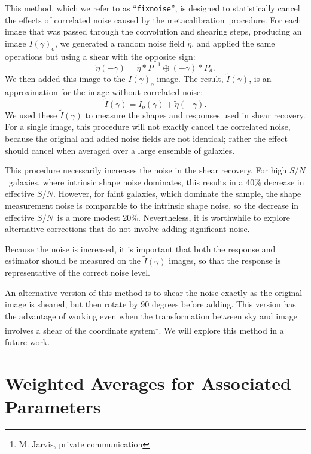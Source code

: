 \documentclass[a4paper,fleqn,usenatbib]{mnras}
\newcommand{\snr}{$S/N$}
\newcommand{\mcal}{metacalibration}
\newcommand{\fixnoise}{\texttt{fixnoise}}
\begin{document}
This method, which we refer to as ``\fixnoise'', is designed to statistically
cancel the effects of correlated noise caused by the \mcal\ procedure.  For each
image that was passed through the convolution and shearing steps, producing
an image $I(\gamma)_o$, we generated a random noise field
$\tilde{\eta}$, and applied the same operations but using a shear with
the opposite sign:
\begin{equation}
    \tilde{\eta}(-\gamma) = \tilde{\eta} \ast P^{-1} \oplus (-\gamma) \ast P_{d}.
\end{equation}
We then added this image to the $I(\gamma)_o$ image.
The result, $\tilde{I}(\gamma)$, is an approximation for the image
without correlated noise:
\begin{equation}
    \tilde{I}(\gamma) = I_o(\gamma) + \tilde{\eta}(-\gamma).
\end{equation}
We used these $\tilde{I}(\gamma)$ to measure the shapes and responses used in
shear recovery.  For a single image, this procedure will not exactly cancel the
correlated noise, because the original and added noise fields are not
identical; rather the effect should cancel when averaged over a large ensemble
of galaxies.

This procedure necessarily increases the noise in the shear recovery.  For high
\snr\ galaxies, where intrinsic shape noise dominates, this results in a 40\%
decrease in effective \snr. However, for faint galaxies, which dominate the
sample, the shape measurement noise is comparable to the intrinsic shape noise,
so the decrease in effective \snr\ is a more modest 20\%.  Nevertheless, it is
worthwhile to explore alternative corrections that do not involve adding
significant noise.

Because the noise is increased, it is important that both the response and
estimator should be measured on the $\tilde{I}(\gamma)$ images, so that the
response is representative of the correct noise level.

An alternative version of this method is to shear the noise exactly as the
original image is sheared, but then rotate by 90 degrees before adding.  This
version has the advantage of working even when the transformation between sky
and image involves a shear of the coordinate system\footnote{M. Jarvis, private
communication}. We will explore this method in a future work.

\section{Weighted Averages for Associated Parameters} \label{sec:weighting}
\end{document}
